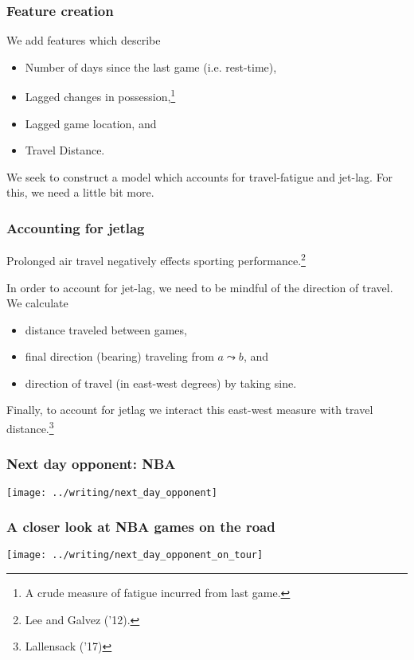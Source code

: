 \documentclass{beamer}
\begin{document}
\begin{frame}   \frametitle{Feature creation}
  We add features which describe
  \vspace{12pt}  
  \begin{itemize}     
    \item Number of days since the last game (i.e. rest-time),
    \item Lagged changes in possession,\footnote{A crude measure of fatigue incurred from last game.}
    \item Lagged game location, and
    \item Travel Distance.   
  \end{itemize}
  \vspace{12pt}We seek to construct a model which accounts for travel-fatigue and jet-lag.
  For this, we need a little bit more. \end{frame}

\begin{frame}   \frametitle{Accounting for jetlag}
  Prolonged air travel negatively effects sporting performance.\footnote{Lee and Galvez ('12).}

  \vspace{12pt}In order to account for jet-lag, we need to be mindful of the direction of travel. We calculate
  \vspace{12pt}\begin{itemize}     \item distance traveled between games,
    \item final direction (bearing) traveling from $a \leadsto b$, and
    \item direction of travel (in east-west degrees) by taking sine.
  \end{itemize}
  \vspace{12pt}Finally, to account for jetlag we interact this east-west measure with travel distance.\footnote{Lallensack ('17)} \end{frame}

\begin{frame}   \frametitle{Next day opponent: NBA}
  \centering \texttt{[image: ../writing/next\_day\_opponent]} \end{frame}

\begin{frame}   \frametitle{A closer look at NBA games on the road}
  \centering \texttt{[image: ../writing/next\_day\_opponent\_on\_tour]} \end{frame}
\end{document}

